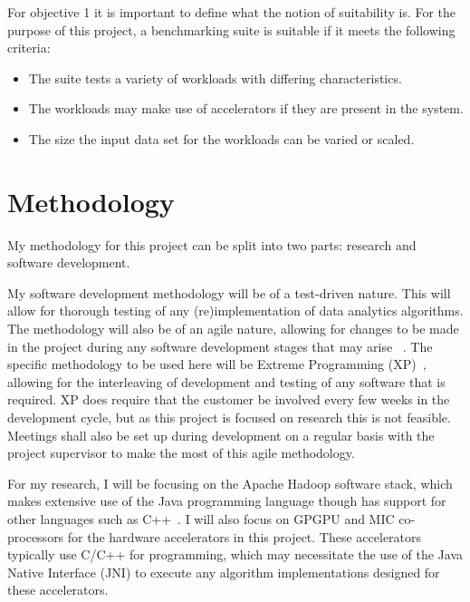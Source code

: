 \documentclass[12pt,a4paper]{article}
\begin{document}
		For objective 1 it is important to define what the notion of suitability is. For the purpose of this project, a benchmarking suite is suitable if it meets the following criteria:

		\begin{itemize}
			\item The suite tests a variety of workloads with differing characteristics.
			\item The workloads may make use of accelerators if they are present in the system.
			\item The size the input data set for the workloads can be varied or scaled.
		\end{itemize}


	\section{Methodology} %
	\label{sec:methodology}

	My methodology for this project can be split into two parts: research and software development.

	My software development methodology will be of a test-driven nature. This will allow for thorough testing of any (re)implementation of data analytics algorithms. The methodology will also be of an agile nature, allowing for changes to be made in the project during any software development stages that may arise~ \cite{sommverville-sweng}. The specific methodology to be used here will be Extreme Programming (XP)~\cite{sommverville-sweng}, allowing for the interleaving of development and testing of any software that is required. XP does require that the customer be involved every few weeks in the development cycle, but as this project is focused on research this is not feasible. Meetings shall also be set up during development on a regular basis with the project supervisor to make the most of this agile methodology.

	For my research, I will be focusing on the Apache Hadoop software stack, which makes extensive use of the Java programming language though has support for other languages such as C++~\cite{mapreduce-tut-apache-hadoop}. I will also focus on GPGPU and MIC co-processors for the hardware accelerators in this project. These accelerators typically use C/C++ for programming, which may necessitate the use of the Java Native Interface (JNI) to execute any algorithm implementations designed for these accelerators.
\end{document}
